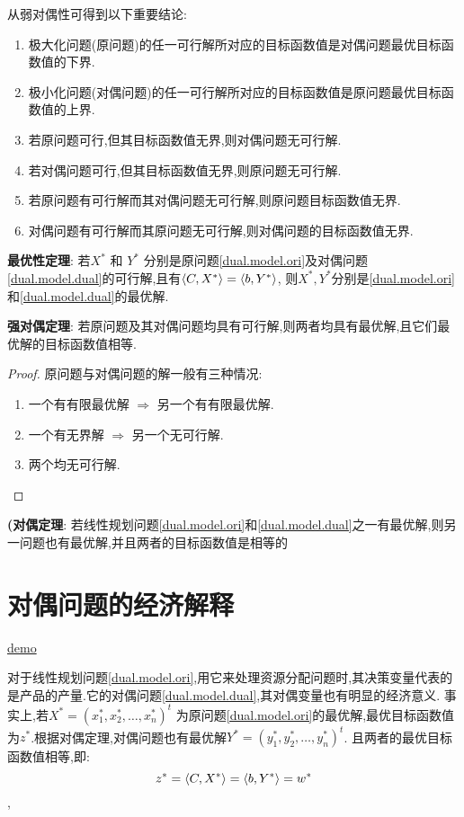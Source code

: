 从弱对偶性可得到以下重要结论:
\begin{enumerate}
\item 极大化问题(原问题)的任一可行解所对应的目标函数值是对偶问题最优目标函数值的下界.
\item 极小化问题(对偶问题)的任一可行解所对应的目标函数值是原问题最优目标函数值的上界.
\item 若原问题可行,但其目标函数值无界,则对偶问题无可行解.
\item 若对偶问题可行,但其目标函数值无界,则原问题无可行解.
\item 若原问题有可行解而其对偶问题无可行解,则原问题目标函数值无界.
\item 对偶问题有可行解而其原问题无可行解,则对偶问题的目标函数值无界.
\end{enumerate}

\begin{theorem}
\textbf{最优性定理}:
若$X^*$ 和 $Y^*$ 分别是原问题\eqref{dual.model.ori}及对偶问题\eqref{dual.model.dual}的可行解,且有$\langle C , X^*\rangle = \langle b , Y^*\rangle$,
则$X^*,Y^*$分别是\eqref{dual.model.ori}和\eqref{dual.model.dual}的最优解.
\end{theorem}

\begin{theorem}
\textbf{强对偶定理}:
若原问题及其对偶问题均具有可行解,则两者均具有最优解,且它们最优解的目标函数值相等.
\end{theorem}
\begin{proof}
原问题与对偶问题的解一般有三种情况:
\begin{enumerate}
\item 一个有有限最优解 $\Rightarrow$ 另一个有有限最优解.
\item 一个有无界解 $\Rightarrow$ 另一个无可行解.
\item 两个均无可行解.
\end{enumerate}
\end{proof}

\begin{theorem}
\textbf{(对偶定理}:
若线性规划问题\eqref{dual.model.ori}和\eqref{dual.model.dual}之一有最优解,则另一问题也有最优解,并且两者的目标函数值是相等的
\end{theorem}

\section{对偶问题的经济解释}
\href{http://course.cug.edu.cn/cugFirst/operational\_research/main/charpter2/p4.htm}{demo}

对于线性规划问题\eqref{dual.model.ori},用它来处理资源分配问题时,其决策变量代表的是产品的产量.它的对偶问题\eqref{dual.model.dual},其对偶变量也有明显的经济意义.
事实上,若$X^* = (x^*_1, x^*_2, \ldots, x^*_n)^t$
为原问题\eqref{dual.model.ori}的最优解,最优目标函数值为$z^*$.根据对偶定理,对偶问题也有最优解$Y^* = (y^*_1, y^*_2, \ldots, y^*_n)^t$.
且两者的最优目标函数值相等,即:
$$z^* = \langle C , X^*\rangle = \langle b , Y^*\rangle = w^*$$,
 
